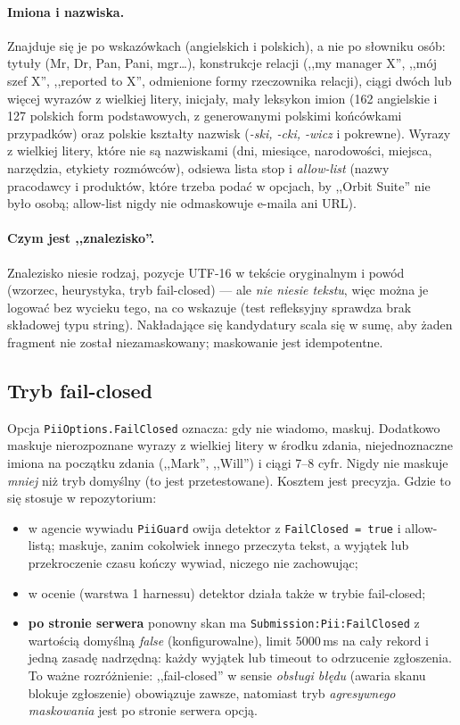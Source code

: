 \paragraph{Imiona i nazwiska.} Znajduje się je po wskazówkach (angielskich i
polskich), a nie po słowniku osób: tytuły (Mr, Dr, Pan, Pani, mgr\ldots), konstrukcje
relacji (,,my manager X'', ,,mój szef X'', ,,reported to X'', odmienione formy
rzeczownika relacji), ciągi dwóch lub więcej wyrazów z wielkiej litery,
inicjały, mały leksykon imion (162 angielskie i 127 polskich form podstawowych, z
generowanymi polskimi końcówkami przypadków) oraz polskie kształty nazwisk
(\emph{-ski, -cki, -wicz} i pokrewne). Wyrazy z wielkiej litery, które nie są
nazwiskami (dni, miesiące, narodowości, miejsca, narzędzia, etykiety
rozmówców), odsiewa lista stop i \emph{allow-list} (nazwy pracodawcy i
produktów, które trzeba podać w opcjach, by ,,Orbit Suite'' nie było osobą;
allow-list nigdy nie odmaskowuje e-maila ani URL).

\paragraph{Czym jest ,,znalezisko''.} Znalezisko niesie rodzaj, pozycje UTF-16 w
tekście oryginalnym i powód (wzorzec, heurystyka, tryb fail-closed) --- ale
\emph{nie niesie tekstu}, więc można je logować bez wycieku tego, na co
wskazuje (test refleksyjny sprawdza brak składowej typu string). Nakładające się
kandydatury scala się w sumę, aby żaden fragment nie został niezamaskowany;
maskowanie jest idempotentne.

\subsection{Tryb fail-closed}

Opcja \texttt{PiiOptions.FailClosed} oznacza: gdy nie wiadomo, maskuj. Dodatkowo
maskuje nierozpoznane wyrazy z wielkiej litery w środku zdania, niejednoznaczne
imiona na początku zdania (,,Mark'', ,,Will'') i ciągi 7--8 cyfr. Nigdy nie
maskuje \emph{mniej} niż tryb domyślny (to jest przetestowane). Kosztem jest
precyzja. Gdzie to się stosuje w repozytorium:

\begin{itemize}[leftmargin=*]
    \item w agencie wywiadu \texttt{PiiGuard} owija detektor z
    \texttt{FailClosed = true} i allow-listą; maskuje, zanim cokolwiek
    innego przeczyta tekst, a wyjątek lub przekroczenie czasu kończy
    wywiad, niczego nie zachowując;
    \item w ocenie (warstwa 1 harnessu) detektor działa także w trybie
    fail-closed;
    \item \textbf{po stronie serwera} ponowny skan ma
    \texttt{Submission:Pii:FailClosed} z wartością domyślną \emph{false}
    (konfigurowalne), limit 5000\,ms na cały rekord i jedną zasadę
    nadrzędną: każdy wyjątek lub timeout to odrzucenie zgłoszenia. To
    ważne rozróżnienie: ,,fail-closed'' w sensie \emph{obsługi błędu} (awaria
    skanu blokuje zgłoszenie) obowiązuje zawsze, natomiast tryb
    \emph{agresywnego maskowania} jest po stronie serwera opcją.
\end{itemize}


